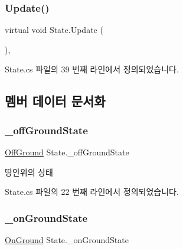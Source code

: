 \subsubsection{\texorpdfstring{Update()}{Update()}}
{\footnotesize\ttfamily virtual void State.\+Update (\begin{DoxyParamCaption}{ }\end{DoxyParamCaption})\hspace{0.3cm}{\ttfamily [virtual]}, {\ttfamily [inherited]}}



State.\+cs 파일의 39 번째 라인에서 정의되었습니다.


\begin{DoxyCode}{0}

\end{DoxyCode}


\subsection{멤버 데이터 문서화}
\mbox{\label{class_state_ad421039bfc35b46969f174c9617ab786}} 
\subsubsection{\texorpdfstring{\_offGroundState}{\_offGroundState}}
{\footnotesize\ttfamily \mbox{\hyperlink{class_state_a7d945e793324c017a973205564cf1a56}{Off\+Ground}} State.\+\_\+off\+Ground\+State\hspace{0.3cm}{\ttfamily [inherited]}}



땅안위의 상태 



State.\+cs 파일의 22 번째 라인에서 정의되었습니다.

\mbox{\label{class_state_ab3170df5e58f541f39edff3c1278d443}} 
\subsubsection{\texorpdfstring{\_onGroundState}{\_onGroundState}}
{\footnotesize\ttfamily \mbox{\hyperlink{class_state_ab9eb1c1d81f1903b8486d1275e78b68e}{On\+Ground}} State.\+\_\+on\+Ground\+State\hspace{0.3cm}{\ttfamily [inherited]}}



